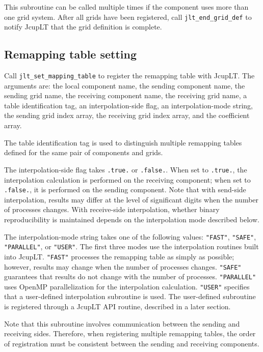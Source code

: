 \documentclass[11pt,a4paper]{report}
\begin{document}
This subroutine can be called multiple times
if the component uses more than one grid system.
After all grids have been registered,
call \texttt{jlt\_end\_grid\_def}
to notify JcupLT that the grid definition is complete.

\subsection{Remapping table setting}

Call \texttt{jlt\_set\_mapping\_table}
to register the remapping table with JcupLT.
The arguments are:
the local component name,
the sending component name,
the sending grid name,
the receiving component name,
the receiving grid name,
a table identification tag,
an interpolation-side flag,
an interpolation-mode string,
the sending grid index array,
the receiving grid index array,
and the coefficient array.

The table identification tag is used
to distinguish multiple remapping tables
defined for the same pair of components and grids.

The interpolation-side flag
takes \texttt{.true.} or \texttt{.false.}.
When set to \texttt{.true.},
the interpolation calculation is performed
on the receiving component;
when set to \texttt{.false.},
it is performed on the sending component.
Note that with send-side interpolation,
results may differ at the level of significant digits
when the number of processes changes.
With receive-side interpolation,
whether binary reproducibility is maintained
depends on the interpolation mode described below.

The interpolation-mode string
takes one of the following values:
\texttt{"FAST"}, \texttt{"SAFE"},
\texttt{"PARALLEL"}, or \texttt{"USER"}.
The first three modes use
the interpolation routines built into JcupLT.
\texttt{"FAST"} processes the remapping table
as simply as possible;
however, results may change
when the number of processes changes.
\texttt{"SAFE"} guarantees that results
do not change with the number of processes.
\texttt{"PARALLEL"} uses OpenMP parallelization
for the interpolation calculation.
\texttt{"USER"} specifies that
a user-defined interpolation subroutine is used.
The user-defined subroutine is registered
through a JcupLT API routine,
described in a later section.

Note that this subroutine involves communication
between the sending and receiving sides.
Therefore, when registering multiple remapping tables,
the order of registration must be consistent
between the sending and receiving components.
\end{document}
